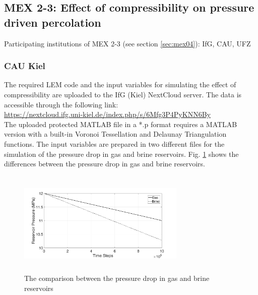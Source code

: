 \subsection{MEX 2-3: Effect of compressibility on pressure driven percolation}

Participating institutions of MEX 2-3 (see section \ref{sec:mex04}): IfG, CAU, UFZ

\subsubsection*{CAU Kiel}

The required LEM code and the input variables for simulating the effect of compressibility are uploaded to the IfG (Kiel) NextCloud server. The data is accessible through the following link:\\
\hyperlink{https://nextcloud.ifg.uni-kiel.de/index.php/s/6Mfg3P4PyKNN6By}{https://nextcloud.ifg.uni-kiel.de/index.php/s/6Mfg3P4PyKNN6By}\\

The uploaded protected MATLAB file in a *.p format requires a MATLAB version with a built-in Voronoi Tessellation and Delaunay Triangulation functions. The input variables are prepared in two different files for the simulation of the pressure drop in gas and brine reservoirs. Fig. \ref{fig:Amir_ME4_Pressure_Data} shows the differences between the pressure drop in gas and brine reservoirs.

\begin{figure}[!ht]
\centering
\includegraphics[width=8cm,height=5cm]{figures/Amir_ME4_Pressure_Data.png}
\caption{The comparison between the pressure drop in gas and brine reservoirs}
\label{fig:Amir_ME4_Pressure_Data}
\end{figure}

